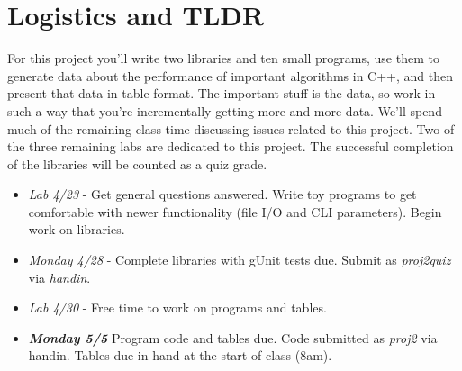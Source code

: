 \documentclass[]{tufte-handout}
\begin{document}
\section{Logistics and TLDR}

For this project you'll write two libraries and ten small programs, use them to generate data about the performance of important algorithms in C++, and then present that data in table format. The important stuff is the data, so work in such a way that you're incrementally getting more and more data. We'll spend much of the remaining class time discussing issues related to this project.  Two of the three remaining labs are dedicated to this project. The successful completion of the libraries will be counted as a quiz grade. 
\begin{itemize}
\item \textit{Lab 4/23} - Get general questions answered. Write toy programs to get comfortable with newer functionality (file I/O and CLI parameters). Begin work on libraries.
\item \textit{Monday 4/28} - Complete libraries with gUnit tests due. Submit as \textit{proj2quiz} via \textit{handin}.
\item \textit{Lab 4/30} - Free time to work on programs and tables.  	
\item \textit{\textbf{Monday 5/5}} Program code and tables due. Code submitted as \textit{proj2} via handin. Tables due in hand at the start of class (8am).
\end{itemize}
\end{document}
